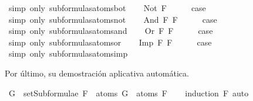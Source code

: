 \begin{isabellebody}
\ {\isacharparenleft}simp\ only{\isacharcolon}\ subformulas{\isacharunderscore}atoms{\isacharunderscore}bot{\isacharparenright}\isanewline
{}\isamarkupfalse%
\isanewline
\ \ \isamarkupfalse%
\ {\isacharparenleft}Not\ F{\isacharparenright}\isanewline
\ \ \isamarkupfalse%
\ \isamarkupfalse%
\ {\isacharquery}case\ \isamarkupfalse%
\ {\isacharparenleft}simp\ only{\isacharcolon}\ subformulas{\isacharunderscore}atoms{\isacharunderscore}not{\isacharparenright}\isanewline
{}\isamarkupfalse%
\isanewline
\ \ \isamarkupfalse%
\ {\isacharparenleft}And\ F{}\ F{}{\isacharparenright}\isanewline
\ \ \isamarkupfalse%
\ \isamarkupfalse%
\ {\isacharquery}case\ \isamarkupfalse%
\ {\isacharparenleft}simp\ only{\isacharcolon}\ subformulas{\isacharunderscore}atoms{\isacharunderscore}and{\isacharparenright}\isanewline
{}\isamarkupfalse%
\isanewline
\ \ \isamarkupfalse%
\ {\isacharparenleft}Or\ F{}\ F{}{\isacharparenright}\isanewline
\ \ \isamarkupfalse%
\ \isamarkupfalse%
\ {\isacharquery}case\ \isamarkupfalse%
\ {\isacharparenleft}simp\ only{\isacharcolon}\ subformulas{\isacharunderscore}atoms{\isacharunderscore}or{\isacharparenright}\isanewline
{}\isamarkupfalse%
\isanewline
\ \ \isamarkupfalse%
\ {\isacharparenleft}Imp\ F{}\ F{}{\isacharparenright}\isanewline
\ \ \isamarkupfalse%
\ \isamarkupfalse%
\ {\isacharquery}case\ \isamarkupfalse%
\ {\isacharparenleft}simp\ only{\isacharcolon}\ subformulas{\isacharunderscore}atoms{\isacharunderscore}imp{\isacharparenright}\isanewline
{}\isamarkupfalse%
%
\endisatagproof
{\isafoldproof}%
%
\isadelimproof
%
\endisadelimproof
%
\begin{isamarkuptext}%
Por último, su demostración aplicativa automática.%
\end{isamarkuptext}\isamarkuptrue%
\isamarkupfalse%
\ {\isachardoublequoteopen}G\ {\isasymin}\ setSubformulae\ F\ {\isasymLongrightarrow}\ atoms\ G\ {\isasymsubseteq}\ atoms\ F{\isachardoublequoteclose}\isanewline
%
\isadelimproof
\ \ %
\endisadelimproof
%
\isatagproof
{}\isamarkupfalse%
\ {\isacharparenleft}induction\ F{\isacharparenright}\ auto%
\endisatagproof
{\isafoldproof}%
%
\isadelimproof
%
\endisadelimproof
%
\begin{isamarkuptext}%
%
\end{isamarkuptext}\isamarkuptrue%
%
\isadelimtheory
%
\endisadelimtheory
%
\isatagtheory
%
\endisatagtheory
{\isafoldtheory}%
%
\isadelimtheory
%
\endisadelimtheory
%
\end{isabellebody}%
